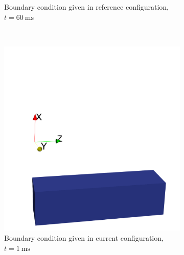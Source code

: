 \begin{figure}
\begin{subfigure}[t]{0.31\textwidth}
    \caption{Boundary condition given in reference configuration, $t=\SI{60}{\milli\second}$}%
    \label{fig:reference_configuration_3}%
  \end{subfigure}
  \\
  \begin{subfigure}[t]{0.31\textwidth}%
    \centering%
    \includegraphics[width=\textwidth]{images/implementation/current_configuration_1_cropped.png}
    \caption{Boundary condition given in current configuration, $t=\SI{1}{\milli\second}$}%
    \label{fig:current_configuration_1}%
  \end{subfigure}
  \quad
  \begin{subfigure}[t]{0.31\textwidth}%
    \centering%

\end{subfigure}
\end{figure}
